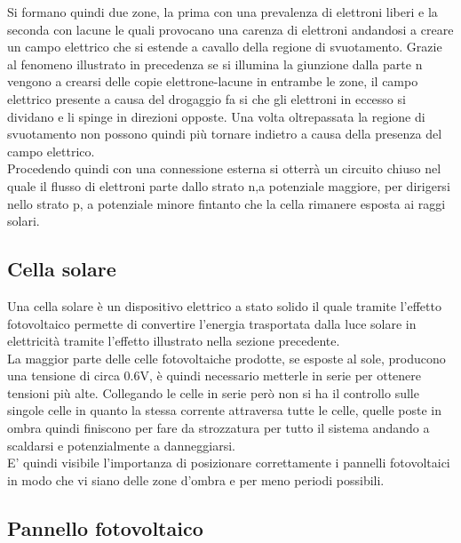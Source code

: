 Si formano quindi due zone, la prima con una prevalenza di elettroni liberi e la seconda con lacune le quali provocano una carenza di elettroni andandosi a creare un campo elettrico che si estende a cavallo della regione di svuotamento.
Grazie al fenomeno illustrato in precedenza se si illumina la giunzione dalla parte n vengono a crearsi delle copie elettrone-lacune in entrambe le zone, il campo elettrico presente a causa del drogaggio fa si che gli elettroni in eccesso si dividano e li spinge in direzioni opposte. Una volta oltrepassata la regione di svuotamento non possono quindi più tornare indietro a causa della presenza del campo elettrico.\\
Procedendo quindi con una connessione esterna si otterrà un circuito chiuso nel quale il flusso di elettroni parte dallo strato n,a potenziale maggiore, per dirigersi nello strato p, a potenziale minore fintanto che la cella rimanere esposta ai raggi solari.\\
\subsection{Cella solare}
Una cella solare è un dispositivo elettrico a stato solido il quale tramite l'effetto fotovoltaico permette di convertire l'energia trasportata dalla luce solare in elettricità tramite l'effetto illustrato nella sezione precedente.\\
La maggior parte delle celle fotovoltaiche prodotte, se esposte al sole, producono una tensione di circa 0.6V, è quindi necessario metterle in serie per ottenere tensioni più alte.
Collegando le celle in serie però non si ha il controllo sulle singole celle in quanto la stessa corrente attraversa tutte le celle, quelle poste in ombra quindi finiscono per fare da strozzatura per tutto il sistema andando a scaldarsi e potenzialmente a danneggiarsi.\\
E' quindi visibile l'importanza di posizionare correttamente i pannelli fotovoltaici in modo che vi siano delle zone d'ombra e per meno periodi possibili.\\
\subsection{Pannello fotovoltaico}
